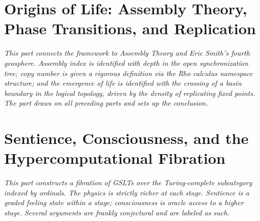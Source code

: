 \documentclass[12pt]{article}
\theoremstyle{remark}
\begin{document}



\part{Origins of Life: Assembly Theory,\\Phase Transitions, and Replication}

\vspace{1em}
\begin{mdframed}[backgroundcolor=remarkgray, linecolor=gray!60,
                 linewidth=1pt, topline=false, rightline=false,
                 bottomline=false]
\small\itshape
This part connects the framework to Assembly Theory and Eric
Smith's fourth geosphere.
Assembly index is identified with depth in the open synchronization
tree; copy number is given a rigorous definition via the
Rho calculus namespace structure; and the emergence of life is
identified with the crossing of a basin boundary in the logical
topology, driven by the density of replicating fixed points.
The part draws on all preceding parts and sets up the conclusion.
\end{mdframed}
\vspace{1em}




\part{Sentience, Consciousness, and the\\Hypercomputational Fibration}

\vspace{1em}
\begin{mdframed}[backgroundcolor=remarkgray, linecolor=gray!60,
                 linewidth=1pt, topline=false, rightline=false,
                 bottomline=false]
\small\itshape
This part constructs a fibration of GSLTs over the Turing-complete
subcategory indexed by ordinals.
The physics is strictly richer at each stage.
Sentience is a graded feeling state within a stage;
consciousness is oracle access to a higher stage.
Several arguments are frankly conjectural and are labeled as such.
\end{mdframed}
\vspace{1em}
\end{document}
